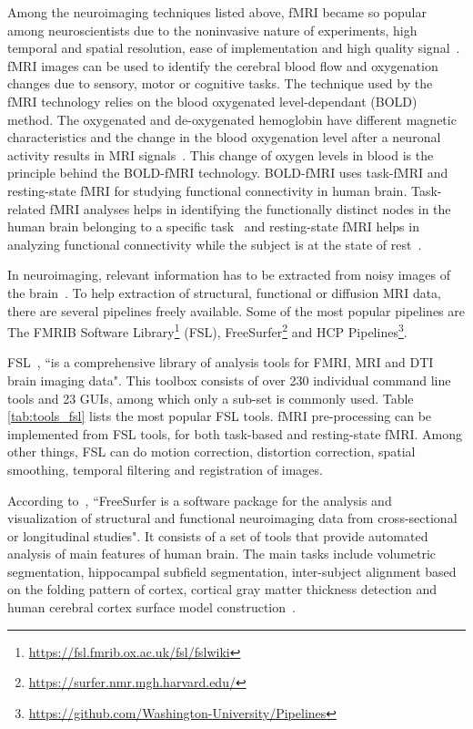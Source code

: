 Among the neuroimaging techniques listed above, fMRI became so popular among neuroscientists due to the noninvasive nature of experiments, high temporal and spatial resolution, ease of implementation and high quality signal~\cite{Bandettini2009}. fMRI images can be used to identify the cerebral blood flow and oxygenation changes due to sensory, motor or cognitive tasks. The technique used by the fMRI technology relies on the blood oxygenated level-dependant (BOLD) method. The oxygenated and de-oxygenated hemoglobin have different magnetic characteristics and the change in the blood oxygenation level after a neuronal activity results in MRI signals~\cite{doi:10.1177/0883073807313047}. This change of oxygen levels in blood is the principle behind the BOLD-fMRI technology. BOLD-fMRI uses task-fMRI and resting-state fMRI for studying functional connectivity in human brain. Task-related fMRI analyses helps in identifying the functionally distinct nodes in the human brain belonging to a specific task~\cite{task_fmri} and resting-state fMRI helps in analyzing functional connectivity while the subject is at the state of rest~\cite{SMITH2013144}.

In neuroimaging, relevant information has to be extracted from noisy images of the brain~\cite{WOOLRICH2009S173}. To help extraction of structural, functional or diffusion MRI data, there are several pipelines freely available. Some of the most popular pipelines are The FMRIB Software Library\footnote{\url{https://fsl.fmrib.ox.ac.uk/fsl/fslwiki}} (FSL), FreeSurfer\footnote{\url{https://surfer.nmr.mgh.harvard.edu/}} and HCP Pipelines\footnote{\url{https://github.com/Washington-University/Pipelines}}.
 
FSL~\cite{JENKINSON2012782}, ``is a comprehensive library of analysis tools for FMRI, MRI and DTI brain imaging data". This toolbox consists of over 230 individual command line tools and 23 GUIs, among which only a sub-set is commonly used. Table \ref{tab:tools_fsl} lists the most popular FSL tools. fMRI pre-processing can be implemented from FSL tools, for both task-based and resting-state fMRI. Among other things, FSL can do motion correction, distortion correction, spatial smoothing, temporal filtering and registration of images.

According to~\cite{freesurfer_website}, ``FreeSurfer is a software package for the analysis and visualization of structural and functional neuroimaging data from cross-sectional or longitudinal studies". It consists of a set of tools that provide automated analysis of main features of human brain. The main tasks include volumetric segmentation, hippocampal subfield segmentation, inter-subject alignment based on the folding pattern of cortex, cortical gray matter thickness detection and human cerebral cortex surface model construction~\cite{Fischl2012}. 

